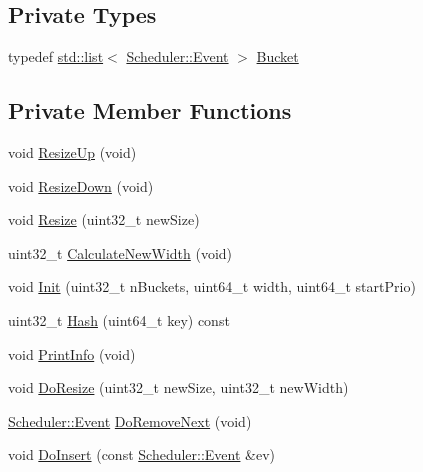 \subsection*{Private Types}
\begin{DoxyCompactItemize}
\item 
typedef \hyperlink{openflow-interface_8h_afd9bcfa176617760671b67580f536fa7}{std\+::list}$<$ \hyperlink{structns3_1_1Scheduler_1_1Event}{Scheduler\+::\+Event} $>$ \hyperlink{classns3_1_1CalendarScheduler_a92e721d4162831c1f0c386034930c967}{Bucket}
\end{DoxyCompactItemize}
\subsection*{Private Member Functions}
\begin{DoxyCompactItemize}
\item 
void \hyperlink{classns3_1_1CalendarScheduler_a6ad5ca9624349ac1a4a3ce565333385f}{Resize\+Up} (void)
\item 
void \hyperlink{classns3_1_1CalendarScheduler_ad177bb1ae48629ed93d2ffc55aa52312}{Resize\+Down} (void)
\item 
void \hyperlink{classns3_1_1CalendarScheduler_ab626f95ab5482e5e6e2a9d5f74363d6c}{Resize} (uint32\+\_\+t new\+Size)
\item 
uint32\+\_\+t \hyperlink{classns3_1_1CalendarScheduler_aa4c7262fde9711cde5b52dfe15dfacbe}{Calculate\+New\+Width} (void)
\item 
void \hyperlink{classns3_1_1CalendarScheduler_a3bf6cdaed8ea65882707fe6eba13eedf}{Init} (uint32\+\_\+t n\+Buckets, uint64\+\_\+t width, uint64\+\_\+t start\+Prio)
\item 
uint32\+\_\+t \hyperlink{classns3_1_1CalendarScheduler_ad60541150596324cac253040af4f8880}{Hash} (uint64\+\_\+t key) const 
\item 
void \hyperlink{classns3_1_1CalendarScheduler_af38a66901da04a652524853488c527a8}{Print\+Info} (void)
\item 
void \hyperlink{classns3_1_1CalendarScheduler_a0261b81664d13feb411d008a1e1bcf9b}{Do\+Resize} (uint32\+\_\+t new\+Size, uint32\+\_\+t new\+Width)
\item 
\hyperlink{structns3_1_1Scheduler_1_1Event}{Scheduler\+::\+Event} \hyperlink{classns3_1_1CalendarScheduler_a42c114e7a4bb68943b63fa9dfc841610}{Do\+Remove\+Next} (void)
\item 
void \hyperlink{classns3_1_1CalendarScheduler_a89cf4c06b7763187a0155320013cf1d1}{Do\+Insert} (const \hyperlink{structns3_1_1Scheduler_1_1Event}{Scheduler\+::\+Event} \&ev)
\end{DoxyCompactItemize}
